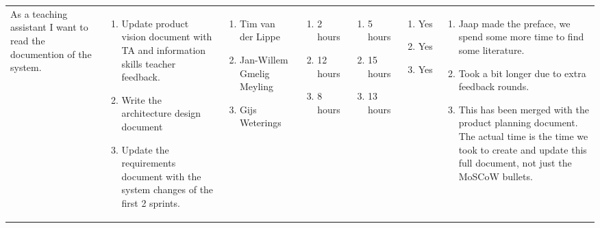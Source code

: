 \documentclass[11pt,a4paper,landscape]{article}
\begin{document}
\begin{table}[h]
\begin{tabular}{|p{3cm}|p{5.0cm}|p{3.0cm}|p{2.2cm}|p{2.2cm}|p{2.0cm}|p{5cm}}

As a teaching assistant I want to read the documention of the system.
&
\begin{enumerate}
\item Update product vision document with TA and information skills teacher feedback.
\item Write the architecture design document
\item Update the requirements document with the system changes of the first 2 sprints.
\end{enumerate} 
           
&
\begin{enumerate}
\item Tim van der Lippe
\item Jan-Willem Gmelig Meyling
\item Gijs Weterings
\end{enumerate}
           
&

\begin{enumerate}
\item 2 hours
\item 12 hours
\item 8 hours
\end{enumerate}

&
\begin{enumerate}
\item 5 hours
\item 15 hours
\item 13 hours
\end{enumerate}

&
\begin{enumerate}
\item Yes
\item Yes
\item Yes
\end{enumerate}
&
\begin{enumerate}
\item Jaap made the preface, we spend some more time to find some literature.
\item Took a bit longer due to extra feedback rounds.
\item This has been merged with the product planning document. The actual time is the time we took to create and update this full document, not just the MoSCoW bullets.
\end{enumerate} 
\end{tabular}
\end{table}
\end{document}
